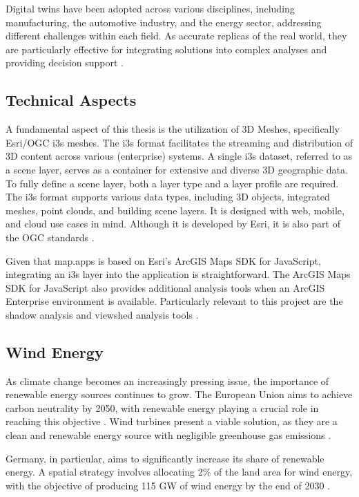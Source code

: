 \documentclass[11pt, titlepage, a4paper]{scrartcl}
\begin{document}
\begin{linenumbers}
    Digital twins have been adopted across various disciplines, including manufacturing, the automotive industry, and the energy sector, addressing different challenges within each field. As accurate replicas of the real world, they are particularly effective for integrating solutions into complex analyses and providing decision support \cite{pylianidisIntroducingDigitalTwins2021}.

    \subsection{Technical Aspects}
    A fundamental aspect of this thesis is the utilization of 3D Meshes, specifically Esri/OGC i3s meshes. The i3s format facilitates the streaming and distribution of 3D content across various (enterprise) systems. A single i3s dataset, referred to as a scene layer, serves as a container for extensive and diverse 3D geographic data. To fully define a scene layer, both a layer type and a layer profile are required.
    The i3s format supports various data types, including 3D objects, integrated meshes, point clouds, and building scene layers. It is designed with web, mobile, and cloud use cases in mind. Although it is developed by Esri, it is also part of the OGC standards \cite{esriincI3sspec}.

    Given that map.apps is based on Esri's ArcGIS Maps SDK for JavaScript, integrating an i3s layer into the application is straightforward. The ArcGIS Maps SDK for JavaScript also provides additional analysis tools when an ArcGIS Enterprise environment is available. Particularly relevant to this project are the shadow analysis \cite{esriincShadowCast} and viewshed analysis tools \cite{esriincGeoprocessingViewshedAnalysis}.

    \subsection{Wind Energy}
    As climate change becomes an increasingly pressing issue, the importance of renewable energy sources continues to grow. The European Union aims to achieve carbon neutrality by 2050, with renewable energy playing a crucial role in reaching this objective \cite{europeancommission.directorategeneralforclimateaction.GoingClimateneutral20502019}. Wind turbines present a viable solution, as they are a clean and renewable energy source with negligible greenhouse gas emissions \cite{pryorClimateChangeImpacts2020}.

    Germany, in particular, aims to significantly increase its share of renewable energy. A spatial strategy involves allocating 2\% of the land area for wind energy, with the objective of producing 115 GW of wind energy by the end of 2030 \cite{WindenergieLand}.


\end{linenumbers}
\end{document}
